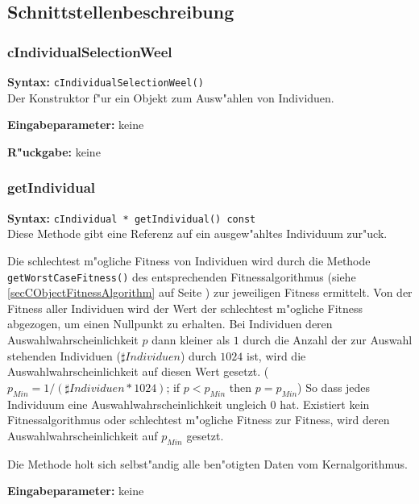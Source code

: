 \subsection{Schnittstellenbeschreibung}

\subsubsection{cIndividualSelectionWeel}

\textbf{Syntax:} \verb|cIndividualSelectionWeel()| \\

Der Konstruktor f"ur ein Objekt zum Ausw"ahlen von Individuen.

\bigskip\noindent
\textbf{Eingabeparameter:} keine

\bigskip\noindent
\textbf{R"uckgabe:} keine


\subsubsection{getIndividual}

\textbf{Syntax:} \verb|cIndividual * getIndividual() const| \\

Diese Methode gibt eine Referenz auf ein ausgew"ahltes Individuum zur"uck.

Die schlechtest m"ogliche Fitness von Individuen wird durch die Methode \verb|getWorstCaseFitness()| des entsprechenden Fitnessalgorithmus (siehe \ref{secCObjectFitnessAlgorithm} auf Seite \pageref{secCObjectFitnessAlgorithm}) zur jeweiligen Fitness ermittelt.
Von der Fitness aller Individuen wird der Wert der schlechtest m"ogliche Fitness abgezogen, um einen Nullpunkt zu erhalten. Bei Individuen deren Auswahlwahrscheinlichkeit $p$ dann kleiner als $1$ durch die Anzahl der zur Auswahl stehenden Individuen ($\sharp Individuen$) durch $1024$ ist, wird die Auswahlwahrscheinlichkeit auf diesen Wert gesetzt. ($p_{Min}=1/(\sharp Individuen * 1024)$; if $p < p_{Min}$ then $p=p_{Min}$) So dass jedes Individuum eine Auswahlwahrscheinlichkeit ungleich $0$ hat.
Existiert kein Fitnessalgorithmus oder schlechtest m"ogliche Fitness zur Fitness, wird deren Auswahlwahrscheinlichkeit auf $p_{Min}$ gesetzt.

Die Methode holt sich selbst"andig alle ben"otigten Daten vom Kernalgorithmus.

\bigskip\noindent
\textbf{Eingabeparameter:} keine

